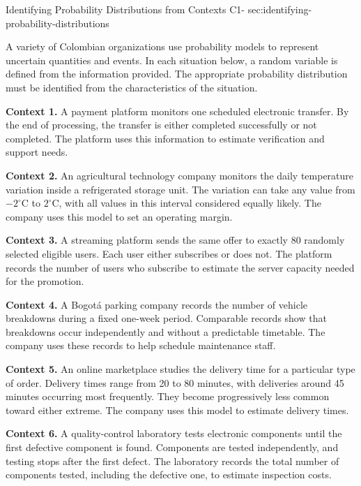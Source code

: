 	
	\sectionScored
	{Identifying Probability Distributions from Contexts}
	{C1-}
	{sec:identifying-probability-distributions}
	{
		A variety of Colombian organizations use probability models to represent
		uncertain quantities and events. In each situation below, a random
		variable is defined from the information provided. The appropriate
		probability distribution must be identified from the characteristics
		of the situation.
		
		
		\textbf{Context 1.} A payment platform monitors one scheduled
		electronic transfer. By the end of processing, the transfer is either
		completed successfully or not completed. The platform uses this information
		to estimate verification and support needs.
		
		\textbf{Context 2.} An agricultural technology company monitors the
		daily temperature variation inside a refrigerated storage unit. The
		variation can take any value from \(-2^\circ\mathrm{C}\) to
		\(2^\circ\mathrm{C}\), with all values in this interval considered
		equally likely. The company uses this model to set an operating margin.
		
		\textbf{Context 3.} A streaming platform sends the same offer to
		exactly 80 randomly selected eligible users. Each user either subscribes
		or does not. The platform records the number of users who subscribe to
		estimate the server capacity needed for the promotion.
		
		\textbf{Context 4.} A Bogotá parking company records the number of
		vehicle breakdowns during a fixed one-week period. Comparable records
		show that breakdowns occur independently and without a predictable
		timetable. The company uses these records to help schedule maintenance
		staff.
		
		\textbf{Context 5.} An online marketplace studies the delivery time
		for a particular type of order. Delivery times range from 20 to
		80 minutes, with deliveries around 45 minutes occurring most frequently.
		They become progressively less common toward either extreme. The
		company uses this model to estimate delivery times.
		
		\textbf{Context 6.} A quality-control laboratory tests electronic
		components until the first defective component is found. Components
		are tested independently, and testing stops after the first defect.
		The laboratory records the total number of components tested, including
		the defective one, to estimate inspection costs.
		
}

